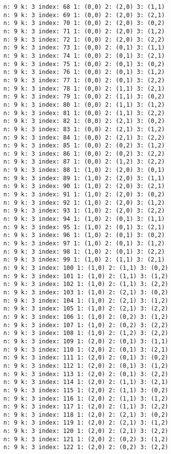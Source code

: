 \documentclass[a4paper]{article}
\begin{document}
\begin{lstlisting}[breaklines]
n: 9 k: 3 index: 68 1: (0,0) 2: (2,0) 3: (1,1)
n: 9 k: 3 index: 69 1: (0,0) 2: (2,0) 3: (2,1)
n: 9 k: 3 index: 70 1: (0,0) 2: (2,0) 3: (0,2)
n: 9 k: 3 index: 71 1: (0,0) 2: (2,0) 3: (1,2)
n: 9 k: 3 index: 72 1: (0,0) 2: (2,0) 3: (2,2)
n: 9 k: 3 index: 73 1: (0,0) 2: (0,1) 3: (1,1)
n: 9 k: 3 index: 74 1: (0,0) 2: (0,1) 3: (2,1)
n: 9 k: 3 index: 75 1: (0,0) 2: (0,1) 3: (0,2)
n: 9 k: 3 index: 76 1: (0,0) 2: (0,1) 3: (1,2)
n: 9 k: 3 index: 77 1: (0,0) 2: (0,1) 3: (2,2)
n: 9 k: 3 index: 78 1: (0,0) 2: (1,1) 3: (2,1)
n: 9 k: 3 index: 79 1: (0,0) 2: (1,1) 3: (0,2)
n: 9 k: 3 index: 80 1: (0,0) 2: (1,1) 3: (1,2)
n: 9 k: 3 index: 81 1: (0,0) 2: (1,1) 3: (2,2)
n: 9 k: 3 index: 82 1: (0,0) 2: (2,1) 3: (0,2)
n: 9 k: 3 index: 83 1: (0,0) 2: (2,1) 3: (1,2)
n: 9 k: 3 index: 84 1: (0,0) 2: (2,1) 3: (2,2)
n: 9 k: 3 index: 85 1: (0,0) 2: (0,2) 3: (1,2)
n: 9 k: 3 index: 86 1: (0,0) 2: (0,2) 3: (2,2)
n: 9 k: 3 index: 87 1: (0,0) 2: (1,2) 3: (2,2)
n: 9 k: 3 index: 88 1: (1,0) 2: (2,0) 3: (0,1)
n: 9 k: 3 index: 89 1: (1,0) 2: (2,0) 3: (1,1)
n: 9 k: 3 index: 90 1: (1,0) 2: (2,0) 3: (2,1)
n: 9 k: 3 index: 91 1: (1,0) 2: (2,0) 3: (0,2)
n: 9 k: 3 index: 92 1: (1,0) 2: (2,0) 3: (1,2)
n: 9 k: 3 index: 93 1: (1,0) 2: (2,0) 3: (2,2)
n: 9 k: 3 index: 94 1: (1,0) 2: (0,1) 3: (1,1)
n: 9 k: 3 index: 95 1: (1,0) 2: (0,1) 3: (2,1)
n: 9 k: 3 index: 96 1: (1,0) 2: (0,1) 3: (0,2)
n: 9 k: 3 index: 97 1: (1,0) 2: (0,1) 3: (1,2)
n: 9 k: 3 index: 98 1: (1,0) 2: (0,1) 3: (2,2)
n: 9 k: 3 index: 99 1: (1,0) 2: (1,1) 3: (2,1)
n: 9 k: 3 index: 100 1: (1,0) 2: (1,1) 3: (0,2)
n: 9 k: 3 index: 101 1: (1,0) 2: (1,1) 3: (1,2)
n: 9 k: 3 index: 102 1: (1,0) 2: (1,1) 3: (2,2)
n: 9 k: 3 index: 103 1: (1,0) 2: (2,1) 3: (0,2)
n: 9 k: 3 index: 104 1: (1,0) 2: (2,1) 3: (1,2)
n: 9 k: 3 index: 105 1: (1,0) 2: (2,1) 3: (2,2)
n: 9 k: 3 index: 106 1: (1,0) 2: (0,2) 3: (1,2)
n: 9 k: 3 index: 107 1: (1,0) 2: (0,2) 3: (2,2)
n: 9 k: 3 index: 108 1: (1,0) 2: (1,2) 3: (2,2)
n: 9 k: 3 index: 109 1: (2,0) 2: (0,1) 3: (1,1)
n: 9 k: 3 index: 110 1: (2,0) 2: (0,1) 3: (2,1)
n: 9 k: 3 index: 111 1: (2,0) 2: (0,1) 3: (0,2)
n: 9 k: 3 index: 112 1: (2,0) 2: (0,1) 3: (1,2)
n: 9 k: 3 index: 113 1: (2,0) 2: (0,1) 3: (2,2)
n: 9 k: 3 index: 114 1: (2,0) 2: (1,1) 3: (2,1)
n: 9 k: 3 index: 115 1: (2,0) 2: (1,1) 3: (0,2)
n: 9 k: 3 index: 116 1: (2,0) 2: (1,1) 3: (1,2)
n: 9 k: 3 index: 117 1: (2,0) 2: (1,1) 3: (2,2)
n: 9 k: 3 index: 118 1: (2,0) 2: (2,1) 3: (0,2)
n: 9 k: 3 index: 119 1: (2,0) 2: (2,1) 3: (1,2)
n: 9 k: 3 index: 120 1: (2,0) 2: (2,1) 3: (2,2)
n: 9 k: 3 index: 121 1: (2,0) 2: (0,2) 3: (1,2)
n: 9 k: 3 index: 122 1: (2,0) 2: (0,2) 3: (2,2)

\end{lstlisting}
\end{document}
